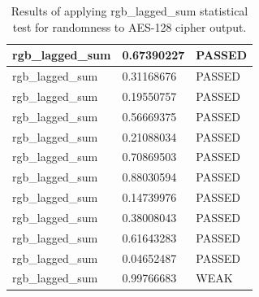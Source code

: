 \documentclass[conference]{IEEEtran}
\begin{document}
\begin{center}
\begin{table}
\begin{tabular}{|l|l|l|}
rgb\_lagged\_sum                       & 0.67390227 & PASSED \\ \hline
rgb\_lagged\_sum                       & 0.31168676 & PASSED \\ \hline
rgb\_lagged\_sum                       & 0.19550757 & PASSED \\ \hline
rgb\_lagged\_sum                       & 0.56669375 & PASSED \\ \hline
rgb\_lagged\_sum                       & 0.21088034 & PASSED \\ \hline
rgb\_lagged\_sum                       & 0.70869503 & PASSED \\ \hline
rgb\_lagged\_sum                       & 0.88030594 & PASSED \\ \hline
rgb\_lagged\_sum                       & 0.14739976 & PASSED \\ \hline
rgb\_lagged\_sum                       & 0.38008043 & PASSED \\ \hline
rgb\_lagged\_sum                       & 0.61643283 & PASSED \\ \hline
rgb\_lagged\_sum                       & 0.04652487 & PASSED \\ \hline
rgb\_lagged\_sum                       & 0.99766683 & WEAK   \\ \hline
\end{tabular}
\caption{Results of applying rgb\_lagged\_sum statistical test for randomness to AES-128 cipher output.}
\label{dieharderesults2}
\end{table}
\end{center}
\end{document}
